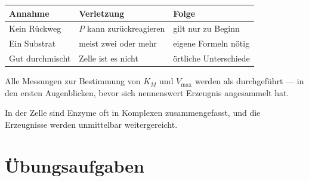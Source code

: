 \begin{warnung}
\begin{center}
{\small
\renewcommand{\arraystretch}{1.5}
\begin{tabular}{@{}P{2.4cm}P{3.0cm}P{2.8cm}@{}}
\toprule
\textbf{Annahme} & \textbf{Verletzung} & \textbf{Folge}\\
\midrule
Kein Rückweg & $P$ kann zurückreagieren & gilt nur zu Beginn\\
Ein Substrat & meist zwei oder mehr & eigene Formeln nötig\\
Gut durchmischt & Zelle ist es nicht & örtliche Unterschiede\\
\bottomrule
\end{tabular}}
\end{center}

Alle Messungen zur Bestimmung von $K_M$ und $V_{\max}$ werden als  durchgeführt --- in den ersten Augenblicken, bevor sich nennenswert Erzeugnis angesammelt hat.

\begin{center}
\begin{minipage}{0.88\textwidth}
\end{minipage}
\end{center}

In der Zelle sind Enzyme oft in Komplexen zusammengefasst, und die Erzeugnisse werden unmittelbar weitergereicht.

\begin{center}
\begin{minipage}{0.88\textwidth}
\end{minipage}
\end{center}
\end{warnung}

\section{Übungsaufgaben}

